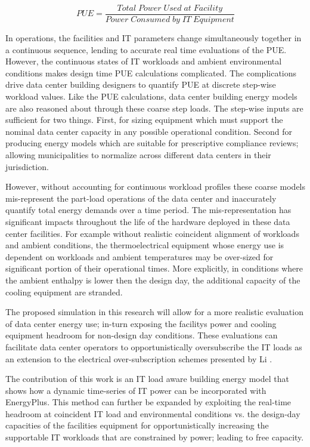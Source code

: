\documentclass[twocolumn, a4paper,10pt]{article}
\begin{document}
\begin{equation}\label{eq:pue}
  PUE  = \frac{Total\; Power\; Used\; at\; Facility}{Power\; Consumed\; by\; IT\; Equipment}
\end{equation}

In operations, the facilities and IT parameters change simultaneously together in a continuous sequence, lending to accurate real time evaluations of the PUE. However, the continuous states of IT workloads and ambient environmental conditions makes design time PUE calculations complicated. The complications drive data center building designers to quantify PUE at discrete step-wise workload values. Like the PUE calculations, data center building energy models are also reasoned about through these coarse step loads. The step-wise inputs are sufficient for two things. First, for sizing equipment which must support the nominal data center capacity in any possible operational condition. Second for producing energy models which are suitable for prescriptive compliance reviews; allowing  municipalities to normalize across different data centers in their jurisdiction. 

However, without accounting for continuous workload profiles these coarse models mis-represent the part-load operations of the data center and inaccurately quantify total energy demands over a time period. The mis-representation has significant impacts throughout the life of the hardware deployed in these data center facilities. For example without realistic coincident alignment of workloads and ambient conditions, the thermoelectrical equipment whose energy use is dependent on workloads and ambient temperatures may be over-sized for significant portion of their operational times. More explicitly, in conditions where the ambient enthalpy is lower then the design day, the additional capacity of the cooling equipment are stranded. 

The proposed simulation in this research will allow for a more realistic evaluation of data center energy use; in-turn exposing the facility\textsc{}s power and cooling equipment headroom for non-design day conditions. These evaluations can facilitate data center operators to opportunistically oversubscribe the IT loads as an extension to the electrical over-subscription schemes presented by Li \citep{Li18}.  

The contribution of this work is an IT load aware building energy model that shows how a dynamic time-series of IT power can be incorporated with EnergyPlus. This method can further be expanded by exploiting the real-time headroom at coincident IT load and environmental conditions vs. the design-day capacities of the facilities equipment for opportunistically increasing the supportable IT workloads that are constrained by power;  leading to free capacity. 
\end{document}
